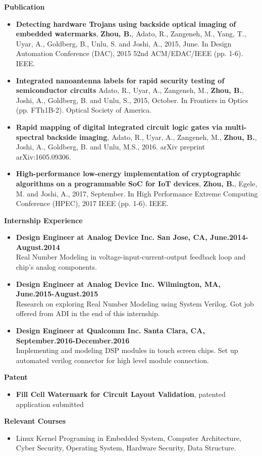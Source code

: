 \documentclass[]{article}
\begin{document}
% 
\noindent \textbf{Publication}
\begin{itemize}
    \item \textbf{Detecting hardware Trojans using backside optical imaging of
	embedded watermarks}, \textbf{Zhou, B.}, Adato, R., Zangeneh, M., Yang, T., Uyar, A.,
Goldberg, B., Unlu, S. and Joshi, A., 2015, June. In Design Automation
Conference (DAC), 2015 52nd ACM/EDAC/IEEE (pp. 1-6). IEEE.
    

	\item \textbf{Integrated nanoantenna labels for rapid security testing of
semiconductor circuits} Adato, R., Uyar, A., Zangeneh, M., \textbf{Zhou, B.}, Joshi, A.,
Goldberg, B. and Unlu, S., 2015, October.  In Frontiers in Optics (pp.
FTh1B-2). Optical Society of America.


	\item \textbf{Rapid mapping of digital integrated circuit logic gates via
multi-spectral backside imaging}, Adato, R., Uyar, A., Zangeneh, M., \textbf{Zhou, B.},
Joshi, A., Goldberg, B. and Unlu, M.S., 2016. arXiv preprint arXiv:1605.09306.

	\item \textbf{High-performance low-energy implementation of cryptographic
algorithms on a programmable SoC for IoT devices}, \textbf{Zhou, B.}, Egele, M. and
Joshi, A., 2017, September.  In High Performance Extreme Computing Conference
(HPEC), 2017 IEEE (pp. 1-6). IEEE.
\end{itemize}

\noindent \textbf{Internship Experience}
    \begin{itemize}
        \item \textbf{Design Engineer at Analog Device Inc. San Jose, CA, June.2014-August.2014}\\
		Real Number Modeling in voltage-input-current-output feedback loop and
chip's analog components.
        \item \textbf{Design Engineer at Analog Device Inc. Wilmington, MA, June.2015-August.2015}\\
		Research on exploring Real Number Modeling using System Verilog.  Got
job offered from ADI in the end of this internship.
		\item \textbf{Design Engineer at Qualcomm Inc. Santa Clara, CA, September.2016-December.2016}\\
		Implementing and modeling DSP modules in touch screen chips. Set up
automated verilog connector for high level module connection.
    \end{itemize}
\noindent \textbf{Patent}
\begin{itemize}
    \item \textbf{Fill Cell Watermark for Circuit Layout Validation}, patented application submitted
\end{itemize}
\noindent \textbf{Relevant Courses}
\begin{itemize}
\item 
Linux Kernel Programing in Embedded System, Computer Architecture, Cyber
Security, Operating System, Hardware Security, Data Structure.
\end{itemize}
\end{document}
